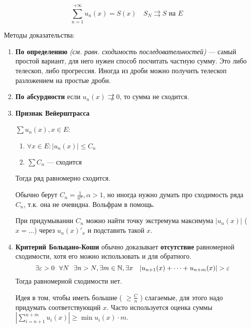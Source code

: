 \[\sum_{n = 1}^{ +\infty} u_n(x) = S(x) \quad S_N \rightrightarrows S \text{ на } E\]

Методы доказательства:
\begin{enumerate}
    \item \textbf{По определению} \textit{(см. равн. сходимость последовательностей)} --- самый простой вариант, для него нужен способ посчитать частную сумму. Это либо телескоп, либо прогрессия. Иногда из дроби можно получить телескоп разложением на простые дроби.
    \item \textbf{По абсурдности} если \(u_n(x)\not\rightrightarrows 0\), то сумма не сходится.
    \item \textbf{Признак Вейерштрасса}

          \(\sum u_n(x), x\in E\):
          \begin{enumerate}
              \item \(\forall x\in E : |u_n(x)| \leq C_n\)
              \item \(\sum C_n\) --- сходится
          \end{enumerate}
          Тогда ряд равномерно сходится.

          Обычно берут \(C_n = \frac{1}{n^\alpha}, \alpha > 1\), но иногда нужно думать про сходимость ряда \(C_n\), т.к. она не очевидна. Вольфрам в помощь.

          При придумывании \(C_n\) можно найти точку экстремума максимума \(|u_n(x)|\) (\(x = \dots\)) через \(u_n(x)'_x\) и подставить такой \(x\).
    \item \textbf{Критерий Больцано-Коши} обычно доказывает \textbf{отсутствие} равномерной сходимости, хотя его можно использовать и для обратного.
          \[\exists \varepsilon > 0 \ \ \forall N \ \ \exists n > N, \exists m\in \mathbb{N}, \exists x \quad  |u_{n + 1}(x) + \dots + u_{n + m}(x)| > \varepsilon\]
          Тогда равномерной сходимости нет.

          Идея в том, чтобы иметь большие ( \( \geq \frac{C}{n}\) ) слагаемые, для этого надо придумать соответствующий \(x\). Часто используется оценка суммы \(|\sum_{i = n + 1}^{n + m} u_i(x)| \geq \min u_i(x) \cdot m\).


\end{enumerate}
